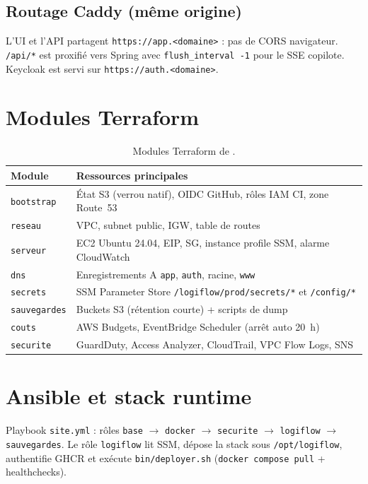 
\subsection{Routage Caddy (même origine)}

L'UI et l'API partagent \texttt{https://app.<domaine>} : pas de CORS navigateur.
\texttt{/api/*} est proxifié vers Spring avec \texttt{flush\_interval -1} pour le SSE copilote.
Keycloak est servi sur \texttt{https://auth.<domaine>}.

\section{Modules Terraform}

\begin{table}[ht]
\centering
\caption{Modules Terraform de .}
\label{tab:tf-modules}
\small
\begin{tabular}{@{}lp{8.8cm}@{}}
\toprule
Module & Ressources principales \\
\midrule
\texttt{bootstrap} & État S3 (verrou natif), OIDC GitHub, rôles IAM CI, zone Route~53 \\
\texttt{reseau} & VPC, subnet public, IGW, table de routes \\
\texttt{serveur} & EC2 Ubuntu 24.04, EIP, SG, instance profile SSM, alarme CloudWatch \\
\texttt{dns} & Enregistrements A \texttt{app}, \texttt{auth}, racine, \texttt{www} \\
\texttt{secrets} & SSM Parameter Store \texttt{/logiflow/prod/secrets/*} et \texttt{/config/*} \\
\texttt{sauvegardes} & Buckets S3 (rétention courte) + scripts de dump \\
\texttt{couts} & AWS Budgets, EventBridge Scheduler (arrêt auto 20~h) \\
\texttt{securite} & GuardDuty, Access Analyzer, CloudTrail, VPC Flow Logs, SNS \\
\bottomrule
\end{tabular}
\end{table}

\section{Ansible et stack runtime}

Playbook \texttt{site.yml} : rôles \texttt{base} $\rightarrow$ \texttt{docker} $\rightarrow$
\texttt{securite} $\rightarrow$ \texttt{logiflow} $\rightarrow$ \texttt{sauvegardes}.
Le rôle \texttt{logiflow} lit SSM, dépose la stack sous \texttt{/opt/logiflow}, authentifie GHCR
et exécute \texttt{bin/deployer.sh} (\texttt{docker compose pull} + healthchecks).

